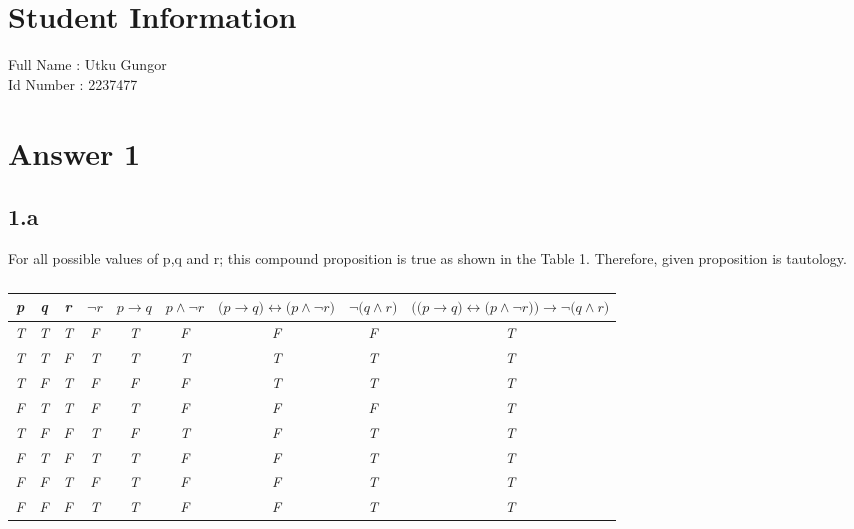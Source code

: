 \documentclass[12pt]{article}
\begin{document}
\section*{Student Information } 
Full Name : Utku Gungor \\
Id Number : 2237477 \\

\section*{Answer 1}

\subsection*{1.a}
\hspace{20px}For all possible values of p,q and r; this compound proposition is true as shown in the Table 1. Therefore, given proposition is tautology.
\begin{table}[H]
	\centering
	\caption{} 
	\bigskip
	\begin{tabular}{|c|c|c|c|c|c|c|c|c|} \hline
	\textit{p} & \textit{q} & \textit{r} & $\neg{r}$ & $\textit{p} \rightarrow{q} $ & $\textit{p} \wedge \neg{r} $ & $\textit{(p} \rightarrow{q)} \leftrightarrow \textit{(p} \wedge \neg{r)} $ & $\neg{(q} \wedge{r)} $ &  $\textit{((p} \rightarrow{q)} \leftrightarrow{(p} \wedge \neg{r))} \rightarrow \neg{(q} \wedge{r)} $ \\ \hline
	\textit{T} & \textit{T} & \textit{T} & \textit{F} & \textit{T} & \textit{F} & \textit{F} & \textit{F} & \textit{T} \\ \hline
	\textit{T} & \textit{T} & \textit{F} & \textit{T} & \textit{T} & \textit{T} & \textit{T} & \textit{T} & \textit{T}\\ \hline
	\textit{T} & \textit{F} & \textit{T} & \textit{F} & \textit{F} & \textit{F} & \textit{T} &\textit{T} & \textit{T}\\ \hline
	\textit{F} & \textit{T} & \textit{T} & \textit{F} & \textit{T} & \textit{F} & \textit{F} &\textit{F} & \textit{T}\\ \hline
	\textit{T} & \textit{F} & \textit{F} & \textit{T} & \textit{F} & \textit{T} & \textit{F} &\textit{T} & \textit{T}\\ \hline
	\textit{F} & \textit{T} & \textit{F} & \textit{T} & \textit{T} & \textit{F} & \textit{F} &\textit{T} & \textit{T}\\ \hline
	\textit{F} & \textit{F} & \textit{T} & \textit{F} & \textit{T} & \textit{F} & \textit{F} &\textit{T} & \textit{T}\\ \hline
	\textit{F} & \textit{F} & \textit{F} & \textit{T} & \textit{T} & \textit{F} & \textit{F} &\textit{T} & \textit{T}\\ \hline
	
	\end{tabular}
	\end{table}
\end{document}
